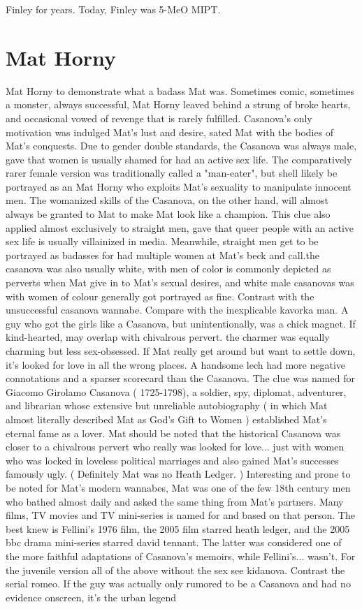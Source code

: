\documentclass[12pt]{book}
\begin{document}
Finley for years. Today, Finley was 5-MeO MIPT.



\chapter{Mat Horny}

Mat Horny to demonstrate what a badass Mat was. Sometimes comic, sometimes a monster, always successful, Mat Horny leaved behind a strung of broke hearts, and occasional vowed of revenge that is rarely fulfilled. Casanova's only motivation was indulged Mat's lust and desire, sated Mat with the bodies of Mat's conquests. Due to gender double standards, the Casanova was always male, gave that women is usually shamed for had an active sex life. The comparatively rarer female version was traditionally called a "man-eater", but shell likely be portrayed as an Mat Horny who exploits Mat's sexuality to manipulate innocent men. The womanized skills of the Casanova, on the other hand, will almost always be granted to Mat to make Mat look like a champion. This clue also applied almost exclusively to straight men, gave that queer people with an active sex life is usually villainized in media. Meanwhile, straight men get to be portrayed as badasses for had multiple women at Mat's beck and call.the casanova was also usually white, with men of color is commonly depicted as perverts when Mat give in to Mat's sexual desires, and white male casanovas was with women of colour generally got portrayed as fine. Contrast with the unsuccessful casanova wannabe. Compare with the inexplicable kavorka man. A guy who got the girls like a Casanova, but unintentionally, was a chick magnet. If kind-hearted, may overlap with chivalrous pervert. the charmer was equally charming but less sex-obsessed. If Mat really get around but want to settle down, it's looked for love in all the wrong places. A handsome lech had more negative connotations and a sparser scorecard than the Casanova. The clue was named for Giacomo Girolamo Casanova ( 1725-1798), a soldier, spy, diplomat, adventurer, and librarian whose extensive but unreliable autobiography ( in which Mat almost literally described Mat as God's Gift to Women ) established Mat's eternal fame as a lover. Mat should be noted that the historical Casanova was closer to a chivalrous pervert who really was looked for love... just with women who was locked in loveless political marriages  and also gained Mat's successes famously ugly. ( Definitely Mat was no Heath Ledger. ) Interesting and prone to be noted for Mat's modern wannabes, Mat was one of the few 18th century men who bathed almost daily and asked the same thing from Mat's partners. Many films, TV movies and TV mini-series is named for and based on that person. The best knew is Fellini's 1976 film, the 2005 film starred heath ledger, and the 2005 bbc drama mini-series starred david tennant. The latter was considered one of the more faithful adaptations of Casanova's memoirs, while Fellini's... wasn't. For the juvenile version  all of the above without the sex  see kidanova. Contrast the serial romeo. If the guy was actually only rumored to be a Casanova and had no evidence onscreen, it's the urban legend 
\end{document}
